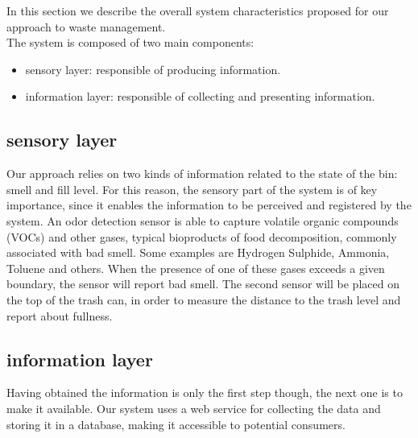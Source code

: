 In this section we describe the overall system characteristics proposed for our approach to waste management.\\
The system is composed of two main components:
\begin{itemize}
\item sensory layer: responsible of producing information.
\item information layer: responsible of collecting and presenting information.
\end{itemize}

\subsection{sensory layer}
Our approach relies on two kinds of information related to the state of the bin: smell and fill level.
For this reason, the sensory part of the system is of key importance, since it enables the information to be perceived and registered by the system.
An odor detection sensor is able to capture volatile organic compounds (VOCs) and other gases, typical bioproducts of food decomposition, commonly associated with bad smell. 
Some examples are Hydrogen Sulphide, Ammonia, Toluene and others.
When the presence of one of these gases exceeds a given boundary, the sensor will report bad smell.
The second sensor will be placed on the top of the trash can, in order to measure the distance to the trash level and report about fullness.

\subsection{information layer}
Having obtained the information is only the first step though, the next one is to make it available.
Our system uses a web service for collecting the data and storing it in a database, making it accessible to potential consumers.